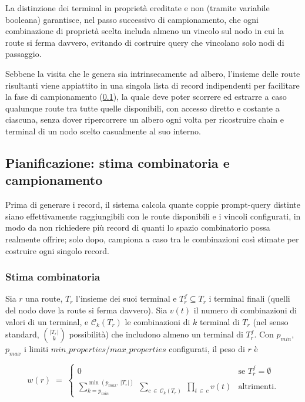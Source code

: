 \documentclass[12pt,a4paper,openright,twoside]{book}
\begin{document}
La distinzione dei terminal in proprietà ereditate e non (tramite variabile
booleana) garantisce, nel passo successivo di campionamento, che ogni
combinazione di proprietà scelta includa almeno un vincolo sul nodo in cui la
route si ferma davvero, evitando di costruire query che vincolano solo nodi di
passaggio.

Sebbene la visita che le genera sia intrinsecamente ad albero, l'insieme delle
route risultanti viene appiattito in una singola lista di record indipendenti
per facilitare la fase di campionamento (\cref{sec:impl-planning}), la quale
deve poter scorrere ed estrarre a caso qualunque route tra tutte quelle
disponibili, con accesso diretto e costante a ciascuna, senza dover ripercorrere
un albero ogni volta per ricostruire chain e terminal di un nodo scelto
casualmente al suo interno.

\subsection{Pianificazione: stima combinatoria e campionamento}
\label{sec:impl-planning}

Prima di generare i record, il sistema calcola quante coppie prompt-query
distinte siano effettivamente raggiungibili con le route disponibili e i vincoli
configurati, in modo da non richiedere più record di quanti lo spazio
combinatorio possa realmente offrire; solo dopo, campiona a caso tra le
combinazioni così stimate per costruire ogni singolo record.

\subsubsection{Stima combinatoria}

Sia $r$ una route, $T_r$ l'insieme dei suoi terminal e $T_r^f \subseteq T_r$ i
terminal finali (quelli del nodo dove la route si ferma davvero). Sia $v(t)$ il
numero di combinazioni di valori di un terminal, e $\mathcal{C}_k(T_r)$ le
combinazioni di $k$ terminal di $T_r$ (nel senso standard, $\binom{|T_r|}{k}$
possibilità) che includono almeno un terminal di $T_r^f$. Con
$\mathit{p_{\min}}$, $\mathit{p_{\max}}$ i limiti
$\mathit{min\_properties}$/$\mathit{max\_properties}$ configurati, il peso di
$r$ è

\begin{equation}
    \label{eq:route-weight}
    w(r) \;=\;
    \begin{cases}
        0 & \text{se } T_r^f = \emptyset \\[4pt]
        \displaystyle\sum_{k=\mathit{p_{\min}}}^{\min(\mathit{p_{\max}},\,|T_r|)}
        \;\sum_{c \,\in\, \mathcal{C}_k(T_r)} \;\prod_{t \,\in\, c} v(t)
          & \text{altrimenti.}
    \end{cases}
\end{equation}
\end{document}
